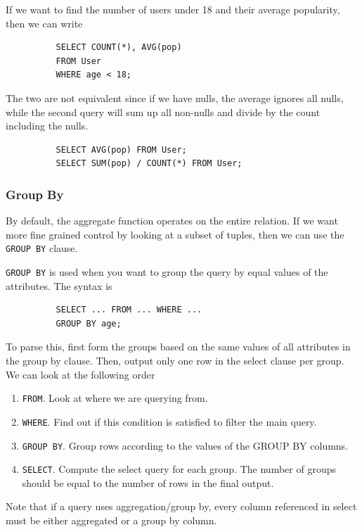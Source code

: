\documentclass{article}
\begin{document}
      \begin{example}
        If we want to find the number of users under 18 and their average popularity, then we can write 
        \begin{lstlisting}
          SELECT COUNT(*), AVG(pop) 
          FROM User 
          WHERE age < 18; 
        \end{lstlisting}
      \end{example}

      \begin{example}
        The two are not equivalent since if we have nulls, the average ignores all nulls, while the second query will sum up all non-nulls and divide by the count including the nulls. 
        \begin{lstlisting}
          SELECT AVG(pop) FROM User; 
          SELECT SUM(pop) / COUNT(*) FROM User; 
        \end{lstlisting}
      \end{example}

    \subsubsection{Group By} 

      By default, the aggregate function operates on the entire relation. If we want more fine grained control by looking at a subset of tuples, then we can use the \texttt{GROUP BY} clause. 

      \begin{definition}
        \texttt{GROUP BY} is used when you want to group the query by equal values of the attributes. The syntax is 
        \begin{lstlisting}
          SELECT ... FROM ... WHERE ... 
          GROUP BY age; 
        \end{lstlisting}
        To parse this, first form the groups based on the same values of all attributes in the group by clause. Then, output only one row in the select clause per group. We can look at the following order
        \begin{enumerate}
          \item \texttt{FROM}. Look at where we are querying from. 
          \item \texttt{WHERE}. Find out if this condition is satisfied to filter the main query. 
          \item \texttt{GROUP BY}. Group rows according to the values of the GROUP BY columns. 
          \item \texttt{SELECT}. Compute the select query for each group. The number of groups should be equal to the number of rows in the final output. 
        \end{enumerate}
        Note that if a query uses aggregation/group by, every column referenced in select must be either aggregated or a group by column. 
      \end{definition}
\end{document}
